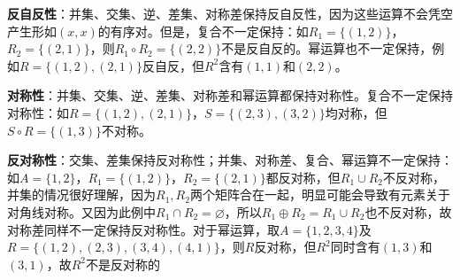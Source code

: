 \documentclass[lang=cn,11pt]{elegantbook}
\begin{document}
\textbf{反自反性}：并集、交集、逆、差集、对称差保持反自反性，因为这些运算不会凭空产生形如$(x,x)$的有序对。但是，复合不一定保持：如$R_1 = \{(1,2)\}$，$R_2 = \{(2,1)\}$，则$R_1 \circ R_2 = \{(2,2)\}$不是反自反的。幂运算也不一定保持，例如$R=\{(1,2),(2,1)\}$反自反，但$R^2$含有$(1,1)$和$(2,2)$。

\textbf{对称性}：并集、交集、逆、差集、对称差和幂运算都保持对称性。复合不一定保持对称性：如$R = \{(1,2),(2,1)\}$，$S=\{(2,3),(3,2)\}$均对称，但$S\circ R=\{(1,3)\}$不对称。

\textbf{反对称性}：交集、差集保持反对称性；并集、对称差、复合、幂运算不一定保持：如$A = \{1,2\}$，$R_1 = \{(1,2)\}$，$R_2 = \{(2,1)\}$都反对称，但$R_1 \cup R_2$不反对称，并集的情况很好理解，因为$R_1,R_2$两个矩阵合在一起，明显可能会导致有元素关于对角线对称。又因为此例中$R_1\cap R_2=\varnothing$，所以$R_1\oplus R_2=R_1\cup R_2$也不反对称，故对称差同样不一定保持反对称性。对于幂运算，取$A=\{1,2,3,4\}$及$R=\{(1,2),(2,3),(3,4),(4,1)\}$，则$R$反对称，但$R^2$同时含有$(1,3)$和$(3,1)$，故$R^2$不是反对称的
\end{document}
